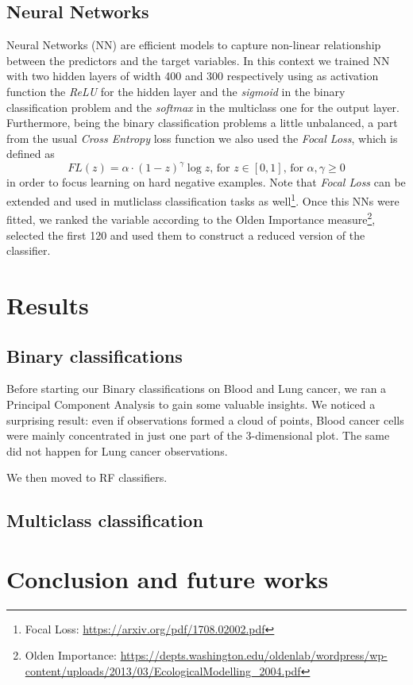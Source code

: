 \documentclass[a4paper,11pt, oneside]{article}  %
\begin{document}
\subsection{Neural Networks}
Neural Networks (NN) are efficient models to capture non-linear relationship between the predictors and the target variables.  In this context we trained NN with two hidden layers of width 400 and 300 respectively using as activation function the \textit{ReLU} for the hidden layer and the \textit{sigmoid} in the binary classification problem and the \textit{softmax} in the multiclass one for the output layer.  Furthermore,  being the binary classification problems a little unbalanced,  a part from the usual \textit{Cross Entropy} loss function we also used the \textit{Focal Loss}, which is defined as $$ FL(z) = \alpha \cdot (1 - z)^{\gamma} \log{z} \text{,  for      }z \in [0,1]  \text{,  for     }  \alpha,  \gamma \geq 0$$ in order to focus learning on hard negative examples.  Note that \textit{Focal Loss} can be extended and used in mutliclass classification tasks as well\footnote{Focal Loss: \url{https://arxiv.org/pdf/1708.02002.pdf}}.  Once this NNs were fitted,  we ranked the variable according to the Olden Importance measure\footnote{Olden Importance: \url{https://depts.washington.edu/oldenlab/wordpress/wp-content/uploads/2013/03/EcologicalModelling_2004.pdf}}, selected the first 120 and used them to construct a reduced version of the classifier.



\section{Results}
\subsection{Binary classifications}
Before starting our Binary classifications on Blood and Lung cancer, we ran a Principal Component Analysis to gain some valuable insights. We noticed a surprising result: even if observations formed a cloud of points, Blood cancer cells were mainly concentrated in just one part of the 3-dimensional plot. The same did not happen for Lung cancer observations.

We then moved to RF classifiers. 





\subsection{Multiclass classification}


\section{Conclusion and future works}
\end{document}
